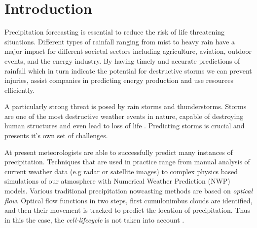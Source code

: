 \documentclass[acmtog, authorversion]{acmart}
\begin{document}
\maketitle

\section{Introduction} \label{introduction}

Precipitation forecasting is essential to reduce the risk of life threatening situations. Different types of rainfall ranging from mist to heavy rain have a major impact for different societal sectors including agriculture, aviation, outdoor events, and the energy industry.
By having timely and accurate predictions of rainfall which in turn indicate the potential for destructive storms we can prevent injuries, assist companies in predicting energy production and use resources efficiently.
\medskip


A particularly strong threat is posed by rain storms and thunderstorms. Storms are one of the most destructive weather events in nature, capable of destroying human structures and even lead to loss of life \cite{noaa-national-severe-storms-laboratory-no-date}. Predicting storms is crucial and presents it's own set of challenges.
\medskip

At present meteorologists are able to successfully predict many instances of precipitation. Techniques that are used in practice range from manual analysis of current weather data (e.g radar or satellite images) to complex physics based simulations of our atmosphere with Numerical Weather Prediction (\textsc{NWP}) models.
Various traditional precipitation nowcasting methods are based on \textit{optical flow}. Optical flow functions in two steps, first cumulonimbus clouds are identified, and then their movement is tracked to predict the location of precipitation. Thus in this the case, the \textit{cell-lifecycle} \cite{noaas-national-weather-service-no-date} is not taken into account \cite{prudden2020review}.
\medskip
\end{document}
